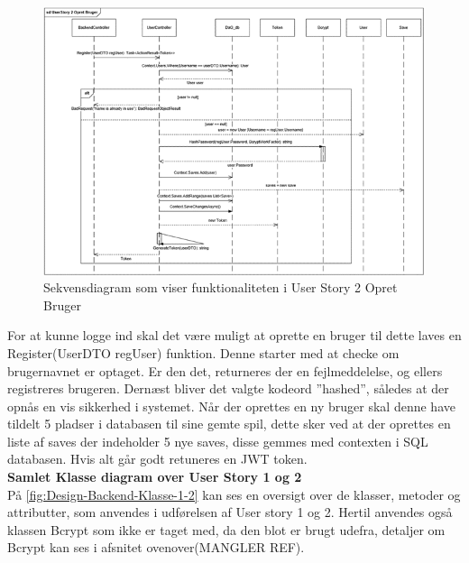 \begin{figure}[H]
\centering
\includegraphics[width = \textwidth]{02-Body/Images/Backend_sekvens_2.PNG}
\caption{Sekvensdiagram som viser funktionaliteten i User Story 2 Opret Bruger}
\label{fig:Design-Backend-Sekvens-2}
\end{figure}

For at kunne logge ind skal det være muligt at oprette en bruger til dette laves en Register(UserDTO regUser) funktion. Denne starter med at checke om brugernavnet er optaget. Er den det, returneres der en fejlmeddelelse, og ellers registreres brugeren. Dernæst bliver det valgte kodeord ”hashed”, således at der opnås en vis sikkerhed i systemet. Når der oprettes en ny bruger skal denne have tildelt 5 pladser i databasen til sine gemte spil, dette sker ved at der oprettes en liste af saves der indeholder 5 nye saves, disse gemmes med contexten i SQL databasen. Hvis alt går godt retuneres en JWT token.\\

\textbf{Samlet Klasse diagram over User Story 1 og 2}\\

På \autoref{fig:Design-Backend-Klasse-1-2} kan ses en oversigt over de klasser, metoder og attributter, som anvendes i udførelsen af User story 1 og 2. Hertil anvendes også klassen Bcrypt som ikke er taget med, da den blot er brugt udefra, detaljer om Bcrypt kan ses i afsnitet ovenover(MANGLER REF).\\

